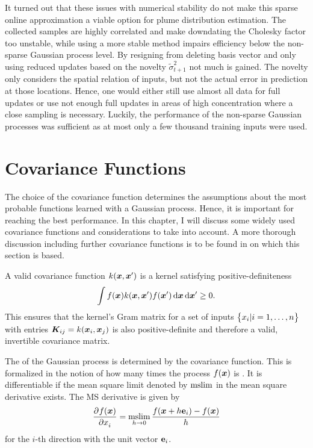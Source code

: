 It turned out that these issues with numerical stability do not make this sparse 
online approximation a viable option for plume distribution estimation. The 
collected samples are highly correlated and make downdating the Cholesky factor 
too unstable, while using a more stable method impairs efficiency below the 
non-sparse Gaussian process level. By resigning from deleting basis vector and 
only using reduced updates based on the novelty $\tilde{\sigma}^2_{t+1}$ not 
much is gained. The novelty only considers the spatial relation of inputs, but 
not the actual error in prediction at those locations. Hence, one would either 
still use almost all data for full updates or use not enough full updates in 
areas of high concentration where a close sampling is necessary. Luckily, the 
performance of the non-sparse Gaussian processes was sufficient as at most only 
a few thousand training inputs were used.

\section{Covariance Functions}\label{sec:covfn}
The choice of the covariance function determines the assumptions about the most 
probable functions learned with a Gaussian process. Hence, it is important for 
reaching the best performance.  In this chapter, I will discuss some widely used 
covariance functions and considerations to take into account. A more thorough 
discussion including further covariance functions is to be found in 
\textcite[Chapter 
4]{Rasmussen:2006vz} on which this section is based.

A valid covariance function $k(\bm{x}, \bm{x}')$ is a kernel satisfying 
positive-definiteness
\begin{equation}
    \int f(\vc x) k(\vc x, \vc x') f(\vc x') \dif \vc x \dif \vc x' \geq 
    0 \text{.}
\end{equation}
This ensures that the kernel's Gram matrix for a set of inputs $\cbr{x_i 
    | i = 1, \dots, n}$ with entries $\bm{K}_{ij} = k(\bm{x}_i, \bm{x}_j)$ is also 
positive-definite and therefore a valid, invertible covariance matrix.

The  of the Gaussian process is determined by the covariance 
function.  This is formalized in the notion of how many times the process $f(\bm{x})$ is .  It is 
differentiable if the mean square limit denoted by $\operatorname*{mslim}$ in the mean square 
derivative exists. The MS derivative is given by
\begin{equation}
    \dpd{f(\vc x)}{x_i} = \mslim_{h \rightarrow 0} \frac{f(\vc x + h\vcc e_i) 
    - f(\vc x)}{h}
\end{equation}
for the $i$-th direction with the unit vector $\textbf{e}_i$.

